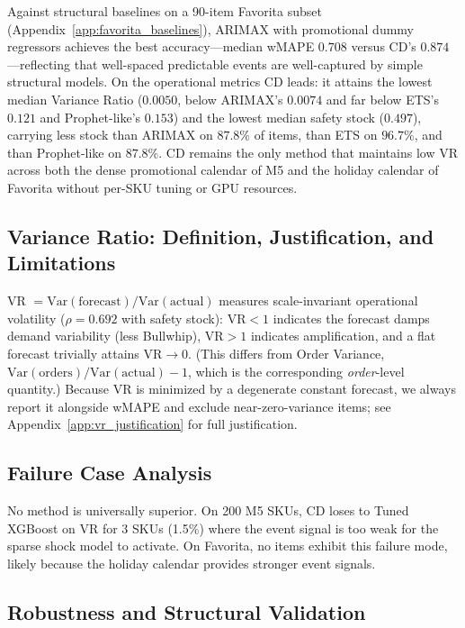 \documentclass[10pt]{article} %
\theoremstyle{plain}
\theoremstyle{definition}
\begin{document}
Against structural baselines on a 90-item Favorita subset (Appendix~\ref{app:favorita_baselines}), ARIMAX with promotional dummy regressors achieves the best accuracy---median wMAPE $0.708$ versus CD's $0.874$---reflecting that well-spaced predictable events are well-captured by simple structural models. On the operational metrics CD leads: it attains the lowest median Variance Ratio ($0.0050$, below ARIMAX's $0.0074$ and far below ETS's $0.121$ and Prophet-like's $0.153$) and the lowest median safety stock ($0.497$), carrying less stock than ARIMAX on $87.8\%$ of items, than ETS on $96.7\%$, and than Prophet-like on $87.8\%$. CD remains the only method that maintains low VR across both the dense promotional calendar of M5 and the holiday calendar of Favorita without per-SKU tuning or GPU resources.

\subsection{Variance Ratio: Definition, Justification, and Limitations}
\label{sec:vr_justification}

VR $= \mathrm{Var}(\mathrm{forecast})/\mathrm{Var}(\mathrm{actual})$ measures scale-invariant operational volatility ($\rho = 0.692$ with safety stock): $\text{VR}<1$ indicates the forecast damps demand variability (less Bullwhip), $\text{VR}>1$ indicates amplification, and a flat forecast trivially attains $\text{VR}\to 0$. (This differs from Order Variance, $\mathrm{Var}(\mathrm{orders})/\mathrm{Var}(\mathrm{actual})-1$, which is the corresponding \emph{order}-level quantity.) Because VR is minimized by a degenerate constant forecast, we always report it alongside wMAPE and exclude near-zero-variance items; see Appendix~\ref{app:vr_justification} for full justification.

\subsection{Failure Case Analysis}

No method is universally superior. On 200 M5 SKUs, CD loses to Tuned XGBoost on VR for 3 SKUs (1.5\%) where the event signal is too weak for the sparse shock model to activate. On Favorita, no items exhibit this failure mode, likely because the holiday calendar provides stronger event signals.

\subsection{Robustness and Structural Validation}
\label{sec:robustness}
\end{document}
